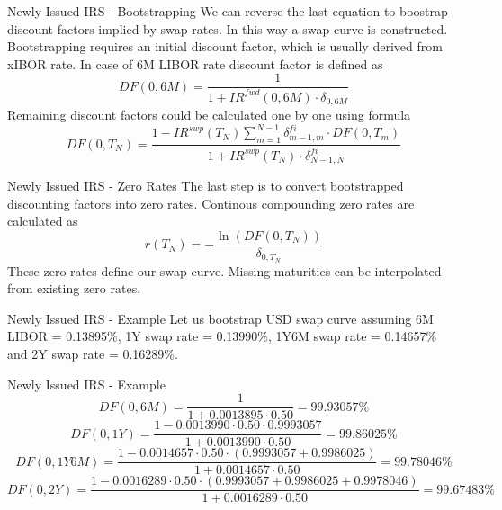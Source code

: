 \documentclass{beamer}
\begin{document}
\begin{frame}{Newly Issued IRS - Bootstrapping}
We can reverse the last equation to boostrap discount factors implied by swap rates. In this way a swap curve is constructed. Bootstrapping requires an initial discount factor, which is usually derived from xIBOR rate. In case of 6M LIBOR rate discount factor is defined as
\begin{equation*}
DF(0, 6M) = \frac{1}{1 + IR^{fwd}(0, 6M) \cdot \delta_{0, 6M}}
\end{equation*}
Remaining discount factors could be calculated one by one using formula
\begin{equation*}
DF(0, T_N)  = \frac{1 - IR^{swp}(T_N) \sum_{m = 1}^{N-1} \delta_{m - 1, m}^{fi} \cdot DF(0, T_m)}{1 + IR^{swp}(T_N) \cdot \delta_{N - 1, N}^{fi}}
\end{equation*}
\end{frame}

\begin{frame}{Newly Issued IRS - Zero Rates}
The last step is to convert bootstrapped discounting factors into zero rates. Continous compounding zero rates are calculated as
\begin{equation*}
r(T_N) = -\frac{\ln(DF(0, T_N))}{\delta_{0, T_N}}
\end{equation*}
These zero rates define our swap curve. Missing maturities can be interpolated from existing zero rates.
\end{frame}

\begin{frame}{Newly Issued IRS - Example}
Let us bootstrap USD swap curve assuming 6M LIBOR = 0.13895\%, 1Y swap rate = 0.13990\%, 1Y6M swap rate = 0.14657\% and 2Y swap rate = 0.16289\%.
\end{frame}

\begin{frame}{Newly Issued IRS - Example}
\begin{equation*}
DF(0, 6M) = \frac{1}{1 + 0.0013895 \cdot 0.50} = 99.93057\% 
\end{equation*}
\begin{equation*}
DF(0, 1Y) = \frac{1 - 0.0013990 \cdot 0.50 \cdot 0.9993057}{1 + 0.0013990 \cdot 0.50} = 99.86025\%
\end{equation*}
\begin{equation*}
DF(0, 1Y6M) = \frac{1 - 0.0014657 \cdot 0.50 \cdot (0.9993057 + 0.9986025)}{1 + 0.0014657 \cdot 0.50} = 99.78046\%
\end{equation*}
\begin{equation*}
DF(0, 2Y) = \frac{1 - 0.0016289 \cdot 0.50 \cdot (0.9993057 + 0.9986025 + 0.9978046)}{1 + 0.0016289 \cdot 0.50} = 99.67483\%
\end{equation*}
\end{frame}
\end{document}
